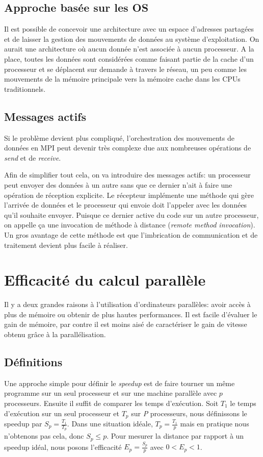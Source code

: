 	\subsection{Approche basée sur les OS}
	Il est possible de concevoir une architecture avec un espace d'adresses partagées et de laisser la gestion des mouvements de données au système d'exploitation. On aurait une architecture où aucun donnée n'est associée à aucun processeur. A la place, toutes les données sont considérées comme faisant partie de la cache d'un processeur et se déplacent sur demande à travers le réseau, un peu comme les mouvements de la mémoire principale vers la mémoire cache dans les CPUs traditionnels. 
		
	\subsection{Messages actifs}
	Si le problème devient plus compliqué, l'orchestration des mouvements de données en MPI peut devenir très complexe due aux nombreuses opérations de \textit{send} et de \textit{receive}.
	
	Afin de simplifier tout cela, on va introduire des messages actifs: un processeur peut envoyer des données à un autre sans que ce dernier n'ait à faire une opération de réception explicite. Le récepteur implémente une méthode qui gère l'arrivée de données et le processeur qui envoie doit l'appeler avec les données qu'il souhaite envoyer. Puisque ce dernier active du code sur un autre processeur, on appelle ça une invocation de méthode à distance (\textit{remote method invocation}). Un gros avantage de cette méthode est que l'imbrication de communication et de traitement devient plus facile à réaliser.
	
\section{Efficacité du calcul parallèle}

Il y a deux grandes raisons à l'utilisation d'ordinateurs parallèles: avoir accès à plus de mémoire ou obtenir de plus hautes performances. Il est facile d'évaluer le gain de mémoire, par contre il est moins aisé de caractériser le gain de vitesse obtenu grâce à la parallélisation.

	\subsection{Définitions}
	Une approche simple pour définir le \textit{speedup} est de faire tourner un même programme sur un seul processeur et sur une machine parallèle avec $p$ processeurs. Ensuite il suffit de comparer les temps d'exécution. Soit $T_1$ le temps d'exécution sur un seul processeur et $T_p$ sur \textit{P} processeurs, nous définissons le speedup par $S_p = \frac{T_1}{T_p}$. Dans une situation idéale, $T_p = \frac{T_1}{p}$ mais en pratique nous n'obtenons pas cela, donc $S_p \leq p$. Pour mesurer la distance par rapport à un speedup idéal, nous posons l'efficacité $E_p = \frac{S_p}{p}$ avec $0 < E_p < 1$.
	
